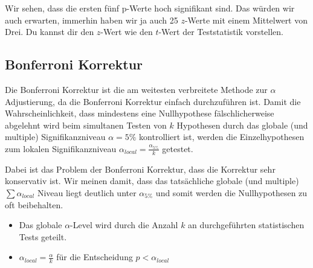 \documentclass[
  letterpaper,
]{scrbook}
\providecommand{\tightlist}{%
  \setlength{\itemsep}{0pt}\setlength{\parskip}{0pt}}\usepackage{longtable,booktabs,array}
\begin{document}
Wir sehen, dass die ersten fünf p-Werte hoch signifikant sind. Das
würden wir auch erwarten, immerhin haben wir ja auch 25 \(z\)-Werte mit
einem Mittelwert von Drei. Du kannst dir den \(z\)-Wert wie den
\(t\)-Wert der Teststatistik vorstellen.

\hypertarget{bonferroni-korrektur}{%
\subsection{Bonferroni Korrektur}\label{bonferroni-korrektur}}

Die Bonferroni Korrektur ist die am weitesten verbreitete Methode zur
\(\alpha\) Adjustierung, da die Bonferroni Korrektur einfach
durchzuführen ist. Damit die Wahrscheinlichkeit, dass mindestens eine
Nullhypothese fälschlicherweise abgelehnt wird beim simultanen Testen
von \(k\) Hypothesen durch das globale (und multiple) Signifikanzniveau
\(\alpha = 5\%\) kontrolliert ist, werden die Einzelhypothesen zum
lokalen Signifikanzniveau \(\alpha_{local} = \tfrac{\alpha_{5\%}}{k}\)
getestet.

Dabei ist das Problem der Bonferroni Korrektur, dass die Korrektur sehr
konservativ ist. Wir meinen damit, dass das tatsächliche globale (und
multiple) \(\sum\alpha_{local}\) Niveau liegt deutlich unter
\(\alpha_{5\%}\) und somit werden die Nullhypothesen zu oft beibehalten.

\begin{tcolorbox}[enhanced jigsaw, coltitle=black, titlerule=0mm, bottomrule=.15mm, opacityback=0, opacitybacktitle=0.6, leftrule=.75mm, title=\textcolor{quarto-callout-important-color}{\faExclamation}\hspace{0.5em}{Adjustierung des \(\boldsymbol{\alpha}\)-Fehlers}, toprule=.15mm, bottomtitle=1mm, toptitle=1mm, left=2mm, breakable, arc=.35mm, colback=white, rightrule=.15mm, colbacktitle=quarto-callout-important-color!10!white, colframe=quarto-callout-important-color-frame]

\begin{itemize}
\tightlist
\item
  Das globale \(\alpha\)-Level wird durch die Anzahl \(k\) an
  durchgeführten statistischen Tests geteilt.
\item
  \(\alpha_{local} = \tfrac{\alpha}{k}\) für die Entscheidung
  \(p < \alpha_{local}\)
\end{itemize}

\end{tcolorbox}
\end{document}
